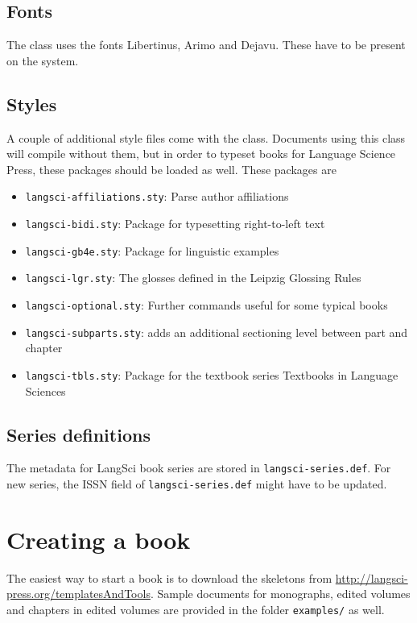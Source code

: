 \documentclass[output=guidelines]{langscibook}
\begin{document}
\section{Fonts}
The class uses the fonts Libertinus, Arimo and Dejavu. These have to be present on the system.

\section{Styles}
A couple of additional style files come with the class. Documents using this class will compile without them, but in order to typeset books for Language Science Press, these packages should be loaded as well. These packages are

\begin{itemize}
 \item \texttt{langsci-affiliations.sty}: Parse author affiliations
 \item \texttt{langsci-bidi.sty}: Package for typesetting right-to-left text
 \item \texttt{langsci-gb4e.sty}: Package for linguistic examples
 \item \texttt{langsci-lgr.sty}: The glosses defined in the Leipzig Glossing Rules
 \item \texttt{langsci-optional.sty}: Further commands useful for some typical books
 \item \texttt{langsci-subparts.sty}: adds an additional sectioning level between part and chapter
 \item \texttt{langsci-tbls.sty}: Package for the textbook series Textbooks in Language Sciences
\end{itemize}

\section{Series definitions}
The metadata for LangSci book series are stored in   \texttt{langsci-series.def}.  For new series, the ISSN field of \texttt{langsci-series.def} might have to be updated.

\chapter{Creating a book}
The easiest way to start a book is to download the skeletons from \url{http://langsci-press.org/templatesAndTools}. Sample documents for monographs, edited volumes and chapters in edited volumes are provided in the folder \texttt{examples/} as well.
\end{document}
